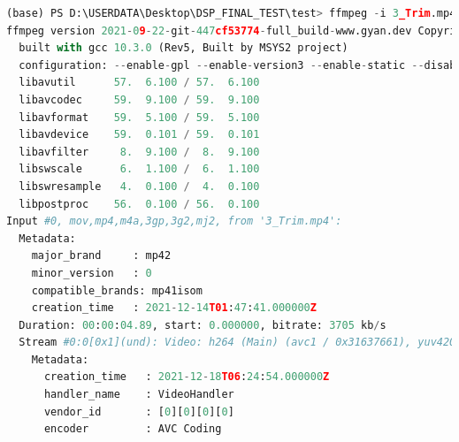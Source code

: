 \documentclass[10pt,UTF8]{ctexart}
\begin{document}
\begin{lstlisting}[language={python}]
(base) PS D:\USERDATA\Desktop\DSP_FINAL_TEST\test> ffmpeg -i 3_Trim.mp4 -s 320x240 -pix_fmt yuv420p -r 15 3_Trim.yuv
ffmpeg version 2021-09-22-git-447cf53774-full_build-www.gyan.dev Copyright (c) 2000-2021 the FFmpeg developers
  built with gcc 10.3.0 (Rev5, Built by MSYS2 project)
  configuration: --enable-gpl --enable-version3 --enable-static --disable-w32threads --disable-autodetect --enable-fontconfig --enable-iconv --enable-gnutls --enable-libxml2 --enable-gmp --enable-lzma --enable-libsnappy --enable-zlib --enable-librist --enable-libsrt --enable-libssh --enable-libzmq --enable-avisynth --enable-libbluray --enable-libcaca --enable-sdl2 --enable-libdav1d --enable-libzvbi --enable-librav1e --enable-libsvtav1 --enable-libwebp --enable-libx264 --enable-libx265 --enable-libxvid --enable-libaom --enable-libopenjpeg --enable-libvpx --enable-libass --enable-frei0r --enable-libfreetype --enable-libfribidi --enable-libvidstab --enable-libvmaf --enable-libzimg --enable-amf --enable-cuda-llvm --enable-cuvid --enable-ffnvcodec --enable-nvdec --enable-nvenc --enable-d3d11va --enable-dxva2 --enable-libmfx --enable-libglslang --enable-vulkan --enable-opencl --enable-libcdio --enable-libgme --enable-libmodplug --enable-libopenmpt --enable-libopencore-amrwb --enable-libmp3lame --enable-libshine --enable-libtheora --enable-libtwolame --enable-libvo-amrwbenc --enable-libilbc --enable-libgsm --enable-libopencore-amrnb --enable-libopus --enable-libspeex --enable-libvorbis --enable-ladspa --enable-libbs2b --enable-libflite --enable-libmysofa --enable-librubberband --enable-libsoxr --enable-chromaprint
  libavutil      57.  6.100 / 57.  6.100
  libavcodec     59.  9.100 / 59.  9.100
  libavformat    59.  5.100 / 59.  5.100
  libavdevice    59.  0.101 / 59.  0.101
  libavfilter     8.  9.100 /  8.  9.100
  libswscale      6.  1.100 /  6.  1.100
  libswresample   4.  0.100 /  4.  0.100
  libpostproc    56.  0.100 / 56.  0.100
Input #0, mov,mp4,m4a,3gp,3g2,mj2, from '3_Trim.mp4':
  Metadata:
    major_brand     : mp42
    minor_version   : 0
    compatible_brands: mp41isom
    creation_time   : 2021-12-14T01:47:41.000000Z
  Duration: 00:00:04.89, start: 0.000000, bitrate: 3705 kb/s
  Stream #0:0[0x1](und): Video: h264 (Main) (avc1 / 0x31637661), yuv420p, 544x960 [SAR 1:1 DAR 17:30], 3643 kb/s, 30 fps, 30 tbr, 30k tbn (default)
    Metadata:
      creation_time   : 2021-12-18T06:24:54.000000Z
      handler_name    : VideoHandler
      vendor_id       : [0][0][0][0]
      encoder         : AVC Coding

\end{lstlisting}
\end{document}
